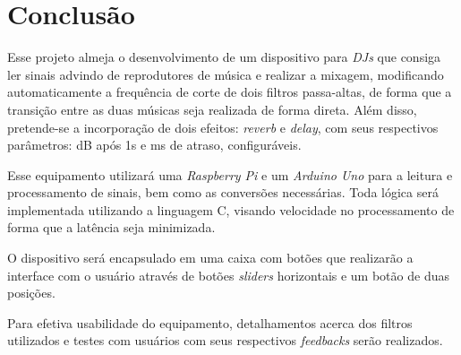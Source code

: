\chapter[Conclusão]{Conclusão}

Esse projeto almeja o desenvolvimento de um dispositivo para \textit{DJs} que consiga ler sinais advindo de reprodutores de música e realizar a mixagem, modificando automaticamente a frequência de corte de dois filtros passa-altas, de forma que a transição entre as duas músicas seja realizada de forma direta. Além disso, pretende-se a incorporação de dois efeitos: \textit{reverb} e \textit{delay}, com seus respectivos parâmetros: dB após 1s e ms de atraso, configuráveis. 

Esse equipamento utilizará uma \textit{Raspberry Pi} e um \textit{Arduino Uno} para a leitura e processamento de sinais, bem como as conversões necessárias. Toda lógica será implementada utilizando a linguagem C, visando velocidade no processamento de forma que a latência seja minimizada.

O dispositivo será encapsulado em uma caixa com botões que realizarão a interface com o usuário através de botões \textit{sliders} horizontais e um botão de duas posições.

Para efetiva usabilidade do equipamento, detalhamentos acerca dos filtros utilizados e testes com usuários com seus respectivos \textit{feedbacks} serão realizados.
